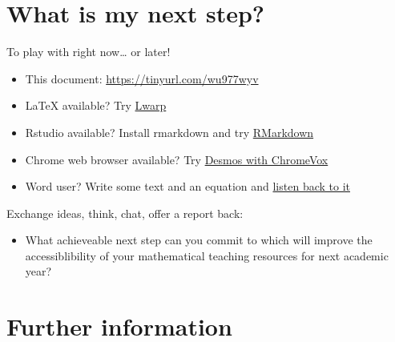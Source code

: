 \documentclass[
  10pt,
  a4paper]{article}
\providecommand{\tightlist}{%
  \setlength{\itemsep}{0pt}\setlength{\parskip}{0pt}}
\theoremstyle{plain}
\theoremstyle{plain}
\theoremstyle{plain}
\theoremstyle{plain}
\theoremstyle{plain}
\theoremstyle{definition}
\theoremstyle{definition}
\theoremstyle{definition}
\theoremstyle{remark}
\begin{document}
\hypertarget{what-is-my-next-step}{%
\section{What is my next step?}\label{what-is-my-next-step}}

To play with right now\ldots{} or later!

\begin{itemize}
\tightlist
\item
  This document: \url{https://tinyurl.com/wu977wyv}
\item
  LaTeX available? Try \href{https://github.com/STEM-Enable/Getting-started-with-accessible-maths-March-2023/raw/main/example/LwarpExample.zip}{Lwarp}
\item
  Rstudio available? Install rmarkdown and try \href{https://stem-enable.github.io/RMarkdownWorkshop/}{RMarkdown}
\item
  Chrome web browser available? Try \href{https://people.bath.ac.uk/cspehj/coventry/arclengthInR.html}{Desmos with ChromeVox}
\item
  Word user? Write some text and an equation and \href{https://stem-enable.github.io/WordWorkshop/immersive.html}{listen back to it}
\end{itemize}

Exchange ideas, think, chat, offer a report back:

\begin{itemize}
\tightlist
\item
  What achieveable next step can you commit to which will improve the accessiblibility of your mathematical teaching resources for next academic year?
\end{itemize}

\hypertarget{further-information}{%
\section{Further information}\label{further-information}}
\end{document}
